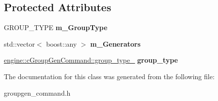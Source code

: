 \subsection*{\-Protected \-Attributes}
\begin{DoxyCompactItemize}
\item 
\hypertarget{classengine_1_1cGroupGenCommand_a7fbbf88777a4b94baf22e8df1714ce2e}{
\-G\-R\-O\-U\-P\-\_\-\-T\-Y\-P\-E {\bfseries m\-\_\-\-Group\-Type}}
\label{classengine_1_1cGroupGenCommand_a7fbbf88777a4b94baf22e8df1714ce2e}

\item 
\hypertarget{classengine_1_1cGroupGenCommand_acff9a3269f987eadf5b39412c09fe497}{
std\-::vector$<$ boost\-::any $>$ {\bfseries m\-\_\-\-Generators}}
\label{classengine_1_1cGroupGenCommand_acff9a3269f987eadf5b39412c09fe497}

\item 
\hypertarget{classengine_1_1cGroupGenCommand_a1ec28a1364d94ffb283a579fe4c585ef}{
\hyperlink{structengine_1_1cGroupGenCommand_1_1group__type__}{engine\-::c\-Group\-Gen\-Command\-::group\-\_\-type\-\_\-} {\bfseries group\-\_\-type}}
\label{classengine_1_1cGroupGenCommand_a1ec28a1364d94ffb283a579fe4c585ef}

\end{DoxyCompactItemize}


\-The documentation for this class was generated from the following file\-:\begin{DoxyCompactItemize}
\item 
groupgen\-\_\-command.\-h\end{DoxyCompactItemize}
